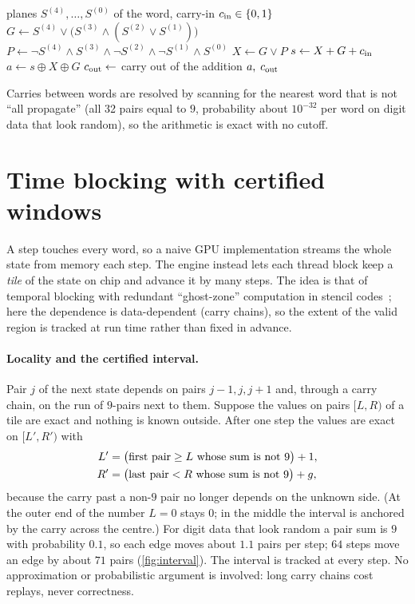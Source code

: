 \documentclass[11pt,a4paper]{article}
\newcommand{\xor}{\oplus}
\newcommand{\gen}{G}
\newcommand{\prop}{P}
\theoremstyle{remark}
\begin{document}
\begin{algorithm}[t]
\caption{Carries of one 32-pair word (low chain; the high chain is the same on bit-reversed planes).}\label{alg:carry}
\begin{algorithmic}[1]
\Require planes $S^{(4)},\dots,S^{(0)}$ of the word, carry-in $c_{\rm in}\in\{0,1\}$
\State $\gen\gets S^{(4)}\lor\bigl(S^{(3)}\land(S^{(2)}\lor S^{(1)})\bigr)$ 
\State $\prop\gets\lnot S^{(4)}\land S^{(3)}\land\lnot S^{(2)}\land\lnot S^{(1)}\land S^{(0)}$ 
\State $X\gets\gen\lor\prop$
\State $s\gets X+\gen+c_{\rm in}$ 
\State $a\gets s\xor X\xor\gen$ 
\State $c_{\rm out}\gets$ carry out of the addition
\State \Return $a,\;c_{\rm out}$
\end{algorithmic}
\end{algorithm}

Carries between words are resolved by scanning for the nearest word that is not ``all propagate'' (all 32 pairs equal to $9$, probability about $10^{-32}$ per word on digit data that look random), so the arithmetic is exact with no cutoff.

\section{Time blocking with certified windows}\label{sec:blocking}

A step touches every word, so a naive GPU implementation streams the whole state from memory each step. The engine instead lets each thread block keep a \emph{tile} of the state on chip and advance it by many steps. The idea is that of temporal blocking with redundant ``ghost-zone'' computation in stencil codes~\cite{frigo2005,meng2009}; here the dependence is data-dependent (carry chains), so the extent of the valid region is tracked at run time rather than fixed in advance.

\paragraph{Locality and the certified interval.}
Pair $j$ of the next state depends on pairs $j-1,j,j+1$ and, through a carry chain, on the run of $9$-pairs next to them. Suppose the values on pairs $[L,R)$ of a tile are exact and nothing is known outside. After one step the values are exact on $[L',R')$ with
\begin{align}\label{eq:interval}
L'&=\bigl(\text{first pair}\ge L\text{ whose sum is not }9\bigr)+1,\notag\\
R'&=\bigl(\text{last pair}<R\text{ whose sum is not }9\bigr)+g,
\end{align}
because the carry past a non-$9$ pair no longer depends on the unknown side. (At the outer end of the number $L=0$ stays $0$; in the middle the interval is anchored by the carry across the centre.) For digit data that look random a pair sum is $9$ with probability $0.1$, so each edge moves about $1.1$ pairs per step; $64$ steps move an edge by about $71$ pairs (\cref{fig:interval}). The interval is tracked at every step. No approximation or probabilistic argument is involved: long carry chains cost replays, never correctness.
\end{document}
